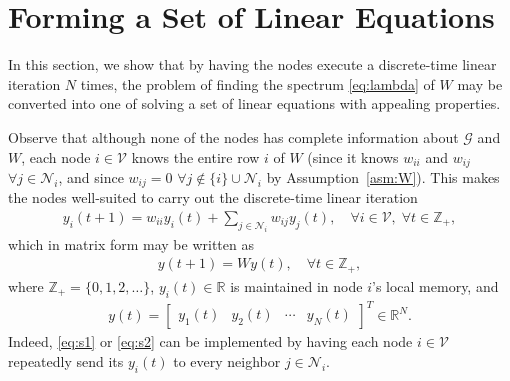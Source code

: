 \documentclass[11pt]{article}
\theoremstyle{plain}
\theoremstyle{definition}
\theoremstyle{remark}
\begin{document}
\section{Forming a Set of Linear Equations}\label{sec:formlineequa}

In this section, we show that by having the nodes execute a discrete-time linear iteration $N$ times, the problem of finding the spectrum \eqref{eq:lambda} of $W$ may be converted into one of solving a set of linear equations with appealing properties.

Observe that although none of the nodes has complete information about $\mathcal{G}$ and $W$, each node $i\in\mathcal{V}$ knows the entire row $i$ of $W$ (since it knows $w_{ii}$ and $w_{ij}$ $\forall j\in\mathcal{N}_i$, and since $w_{ij}=0$ $\forall j\notin\{i\}\cup\mathcal{N}_i$ by Assumption~\ref{asm:W}). This makes the nodes well-suited to carry out the discrete-time linear iteration
\begin{align}
y_i(t+1)=w_{ii}y_i(t)+\sum_{j\in\mathcal{N}_i}w_{ij}y_j(t),\quad\forall i\in\mathcal{V},\;\forall t\in\mathbb{Z}_+,\label{eq:s1}
\end{align}
which in matrix form may be written as
\begin{align}
y(t+1)=Wy(t),\quad\forall t\in\mathbb{Z}_+,\label{eq:s2}
\end{align}
where $\mathbb{Z}_+=\{0,1,2,\ldots\}$, $y_i(t)\in\mathbb{R}$ is maintained in node $i$'s local memory, and
\begin{align}
y(t)=\begin{bmatrix}y_1(t) & y_2(t) & \cdots & y_N(t)\end{bmatrix}^T\in\mathbb{R}^N.\label{eq:s3}
\end{align}
Indeed, \eqref{eq:s1} or \eqref{eq:s2} can be implemented by having each node $i\in\mathcal{V}$ repeatedly send its $y_i(t)$ to every neighbor $j\in\mathcal{N}_i$.
\end{document}
